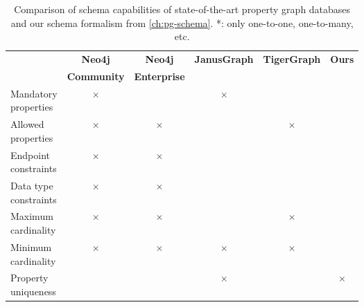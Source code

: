 \documentclass{report}
\theoremstyle{definition}
\newcommand{\yes}{\cellcolor{lightgreen}\color{green}\checkmark}
\newcommand{\no}{\cellcolor{lightred}\color{red}$\times$}
\begin{document}
\begin{table}[t]
  \centering
  \begin{tabular}{lccccc}
    \hline
     & \textbf{Neo4j}     & \textbf{Neo4j}      & \textbf{JanusGraph} & \textbf{TigerGraph} & \textbf{Ours} \\
     & \textbf{Community} & \textbf{Enterprise} &                     &                     &               \\
    \hline
    \makecell{Mandatory                                                                                     \\properties}   & \no                & \yes                & \no                 & \yes                & \yes          \\
    \hline
    \makecell{Allowed                                                                                       \\properties}     & \no                & \no                 & \yes                & \no                 & \yes          \\
    \hline
    \makecell{Endpoint                                                                                      \\constraints}    & \no                & \no                 & \yes                & \yes                & \yes          \\
    \hline
    \makecell{Data type                                                                                     \\constraints}   & \no                & \no                 & \yes                & \yes                & \yes          \\
    \hline
    \makecell{Maximum                                                                                       \\cardinality}     & \no                & \no                 & \yes*               & \no                 & \yes          \\
    \hline
    \makecell{Minimum                                                                                       \\cardinality}     & \no                & \no                 & \no                 & \no                 & \yes          \\
    \hline
    \makecell{Property                                                                                      \\uniqueness}    & \yes               & \yes                & \no                 & \yes                & \no           \\
    \hline
  \end{tabular}
  \caption[Comparison of schema capabilities of state-of-the-art property graph databases and our schema formalism]{Comparison of schema capabilities of state-of-the-art property graph databases and our schema formalism from \autoref{ch:pg-schema}. *: only one-to-one, one-to-many, etc.}
  \label{tab:schema-comparison}
\end{table}
\end{document}
